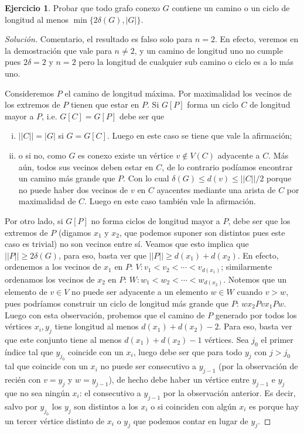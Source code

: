 \documentclass[12pt]{report}
\theoremstyle{plain}
\theoremstyle{definition}
\newtheorem{exercise}[theorem]{Ejercicio}
\newenvironment{solution}{\begin{proof}[Solución]}{\end{proof}}
\newcommand{\abs}[1]{\left \vert #1 \right \vert}
\newcommand{\Abs}[1]{\left \vert \left \vert #1 \right \vert \right \vert}
\begin{document}
\begin{exercise}
Probar que todo grafo conexo $G$ contiene un camino o un ciclo de longitud al menos $\min \{2 \delta (G) , \abs G\}$.
\end{exercise}
\begin{solution}
Comentario, el resultado es falso solo para $n = 2$. En efecto, veremos en la demostración que vale para $n \neq 2$,
y un camino de longitud uno no cumple pues $2 \delta = 2$ y $n = 2$ pero la longitud de cualquier sub camino o ciclo
es a lo más uno.

Consideremos $P$ el camino de longitud máxima. Por maximalidad los vecinos de los extremos de $P$ tienen que estar en $P$. Si $G[P]$ forma un ciclo $C$ de longitud mayor a $P$, i.e. $G[C] = G[P]$ debe ser que
\begin{enumerate}[(i)]
\item $\Abs C = \abs G$ si $G = G[C]$. Luego en este caso se tiene que vale la afirmación;
\item o si no, como $G$ es conexo existe un vértice $v \not \in V(C)$ adyacente a $C$. Más aún, todos sus vecinos deben estar en $C$, de lo contrario podíamos encontrar un camino más grande que $P$. Con lo cual $\delta (G) \leq d (v) \leq \Abs C / 2$ porque no puede haber dos vecinos de $v$ en $C$ ayacentes mediante una arista de $C$ por maximalidad de $C$. Luego en este caso también vale la afirmación.
\end{enumerate}

Por otro lado, si $G[P]$ no forma ciclos de longitud mayor a $P$, debe ser que los extremos de $P$ (digamos $x_1$ y $x_2$, que podemos suponer son distintos pues este caso es trivial) no son vecinos entre sí. Veamos que esto implica que $\Abs P \geq 2 \delta (G)$, para eso, basta ver que $\Abs P \geq d (x_1) + d (x_2)$. En efecto, ordenemos a los vecinos de $x_1$ en $P$: $V: v_1<v_2< \cdots < v_{d(x_1)}$; similarmente ordenamos los vecinos de $x_2$ en $P$: $W: w_1 < w_2 <\cdots < w_{d(x_2)}$. Notemos que un elemento de $v \in V$ no puede ser adyacente a un elemento $w \in W$ cuando $v > w$, pues podríamos construir un ciclo de longitud más grande que $P$: $w x_2 P v x_1 P w$. Luego con esta observación, probemos que el camino de $P$ generado por todos los vértices $x_i,y_j$ tiene longitud al menos $d(x_1) + d(x_2) -2$. Para eso, basta ver que este conjunto tiene al menos $d (x_1) + d(x_2) -1$ vértices. Sea $j_0$ el primer índice tal que $y_{j_0}$ coincide con un $x_i$, luego debe ser que para todo $y_j$ con $j > j_0$ tal que coincide con un $x_i$ no puede ser consecutivo a $y_{j-1}$ (por la observación de recién con $v = y_{j}$ y $w = y_{j-1}$), de hecho debe haber un vértice entre $y_{j-1}$ e $y_j$ que no sea ningún $x_i$: el consecutivo a $y_{j-1}$ por la observación anterior. Es decir, salvo por $y_{j_0}$ los $y_j$ son distintos a los $x_i$ o si coinciden con algún $x_i$ es porque hay un tercer vértice distinto de $x_i$ o $y_j$ que podemos contar en lugar de $y_j$.
\end{solution}
\end{document}
